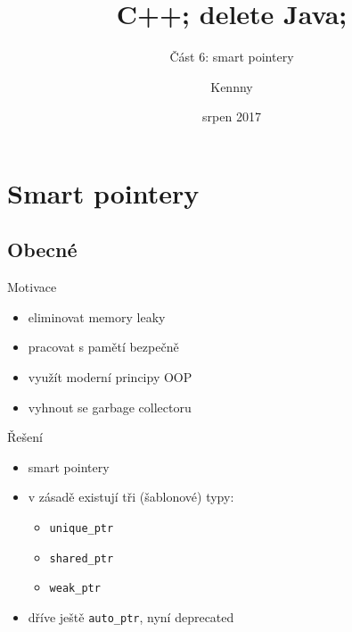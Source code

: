 \documentclass{beamer}
\begin{document}
\title{C++; delete Java;}
\subtitle{Část 6: smart pointery}
\author{Kennny}
\date{srpen 2017}

\frame{\titlepage}


\newenvironment{xframe}[1][]
  {\begin{frame}[fragile,environment=xframe,#1]}
  {\end{frame}}

\section{Smart pointery}
\subsection{Obecné}

\begin{xframe}{Motivace}
	\begin{itemize}
		\item eliminovat memory leaky
		\item pracovat s pamětí bezpečně
		\item využít moderní principy OOP
		\item vyhnout se garbage collectoru
	\end{itemize}
	\begin{quote}
		\end{quote}
\end{xframe}

\begin{xframe}{Řešení}
	\begin{itemize}
		\item smart pointery
		\item v zásadě existují tři (šablonové) typy:
			\begin{itemize}
				\item \texttt{unique\_ptr}
				\item \texttt{shared\_ptr}
				\item \texttt{weak\_ptr}
			\end{itemize}
		\item dříve ještě \texttt{auto\_ptr}, nyní deprecated
	\end{itemize}
\end{xframe}
\end{document}
